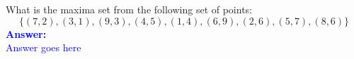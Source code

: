 \item{}
What is the maxima set from the following set of points:
$$\lbrace(7,2),(3,1),(9,3),(4,5),(1,4),(6,9),(2,6),(5,7),(8,6)\rbrace$$
\vskip12pt
\ifanswers
\textcolor{blue}{
\textbf{Answer:}\\[6pt]
Answer goes here
}
\newpage
\fi
